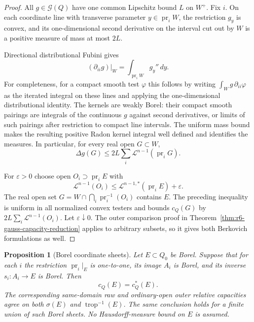 \documentclass[11pt,a4paper]{article}
\numberwithin{equation}{section}
\newtheorem{proposition}[theorem]{Proposition}
\theoremstyle{definition}
\theoremstyle{remark}
\begin{document}
\begin{proof}
All $g\in\mathcal G(Q)$ have one common Lipschitz bound $L$ on
$W^+$. Fix $i$. On each coordinate line with transverse parameter
$y\in\operatorname{pr}_iW$, the restriction $g_y$ is convex, and
its one-dimensional second derivative on the interval cut out by
$W$ is a positive measure of mass at most $2L$.

Directional distributional Fubini gives
\[
                  (\partial_{ii}g)|_W
                     =\int_{\operatorname{pr}_iW}g_y''\,dy.
\]
For completeness, for a compact smooth test $\varphi$ this follows
by writing $\int_Wg\,\partial_{ii}\varphi$ as the iterated integral
on these lines and applying the one-dimensional distributional
identity. The kernels are weakly Borel: their compact smooth pairings
are integrals of the continuous $g$ against second derivatives, or
limits of such pairings after restriction to compact line intervals.
The uniform mass bound makes the resulting positive Radon kernel
integral well defined and identifies the measures. In particular,
for every real open $G\subset W$,
\[
            \Delta g(G)\le2L\sum_i
                                   \mathcal L^{n-1}(\operatorname{pr}_iG).
\]

For $\varepsilon>0$ choose open $O_i\supset\operatorname{pr}_iE$
with
\[
 \mathcal L^{n-1}(O_i)
       \le\mathcal L^{n-1,*}(\operatorname{pr}_iE)+\varepsilon.
\]
The real open set $G=W\cap\bigcap_i\operatorname{pr}_i^{-1}(O_i)$
contains $E$. The preceding inequality is uniform in all normalized
convex testers and bounds $c_Q(G)$ by $2L\sum_i\mathcal L^{n-1}(O_i)$.
Let $\varepsilon\downarrow0$. The outer comparison proof in
Theorem~\ref{thm:r6-gauss-capacity-reduction} applies to arbitrary
subsets, so it gives both Berkovich formulations as well.
\end{proof}

\begin{proposition}[Borel coordinate sheets]
\label{prop:r6-borel-coordinate-sheet-C2}
Let $E\subset Q_0$ be Borel. Suppose that for each $i$ the restriction
$\operatorname{pr}_i|_E$ is one-to-one, its image $A_i$ is Borel,
and its inverse $s_i:A_i\to E$ is Borel. Then
\[
                              c_Q(E)=c_Q^*(E).
\]
The corresponding same-domain raw and ordinary-open outer relative
capacities agree on both $\sigma(E)$ and $\operatorname{trop}^{-1}(E)$.
The same conclusion holds for a finite union of such Borel sheets.
No Hausdorff-measure bound on $E$ is assumed.
\end{proposition}
\end{document}
